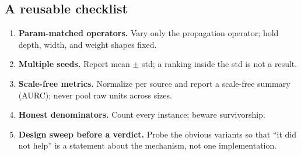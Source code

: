 \subsection{A reusable checklist}
\begin{enumerate}
\item \textbf{Param-matched operators.} Vary only the propagation operator; hold depth,
width, and weight shapes fixed.
\item \textbf{Multiple seeds.} Report mean $\pm$ std; a ranking inside the std is not a
result.
\item \textbf{Scale-free metrics.} Normalize per source and report a scale-free summary
(AURC); never pool raw units across sizes.
\item \textbf{Honest denominators.} Count every instance; beware survivorship.
\item \textbf{Design sweep before a verdict.} Probe the obvious variants so that ``it
did not help'' is a statement about the mechanism, not one implementation.
\end{enumerate}
